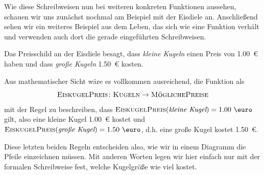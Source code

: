 \documentclass[../../main.tex]{subfiles}
\begin{document}
Wie diese Schreibweisen nun bei weiteren konkreten Funktionen aussehen, schauen wir uns zunächst nochmal am Beispiel mit der Eisdiele an. Anschließend sehen wir ein weiteres Beispiel aus dem Leben, das sich wie eine Funktion verhält und verwenden auch dort die gerade eingeführten Schreibweisen.

\begin{example}{}
    Das Preisschild an der Eisdiele besagt, dass \emph{kleine Kugeln} einen Preis von 1.00~\euro{} haben und dass \emph{große Kugeln} 1.50~\euro{} kosten. 
    
    Aus mathematischer Sicht wäre es vollkommen ausreichend, die Funktion als \[\textsc{EiskugelPreis}\colon\textsc{Kugeln}\rightarrow\textsc{MöglichePreise}\] 
    mit der Regel zu beschreiben, dass $\textsc{EiskugelPreis}(\textit{kleine Kugel})=\text{1.00 \euro}$ gilt, also eine kleine Kugel 1.00~\euro{} kostet und $\textsc{EiskugelPreis}(\textit{große Kugel})=\text{1.50 \euro}$, d.h. eine große Kugel kostet 1.50~\euro. 
    
    Diese letzten beiden Regeln entscheiden also, wie wir in einem Diagramm die Pfeile einzeichnen müssen. Mit anderen Worten legen wir hier einfach nur mit der formalen Schreibweise fest, welche Kugelgröße wie viel kostet.
\end{example}
\end{document}
